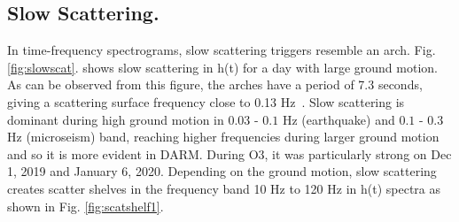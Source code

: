 \documentclass[12pt]{iopart}
\begin{document}
\subsection{Slow Scattering.}
In time-frequency spectrograms, slow scattering triggers resemble an arch.  Fig. \ref{fig:slowscat}. shows slow scattering in h(t) for a day with large ground motion.  As can be observed from this figure, the arches have a period of 7.3 seconds, giving a scattering surface frequency close to 0.13 Hz~\cite{alogsid}. 
Slow scattering is  dominant during high ground motion in $0.03$ - $0.1$ Hz (earthquake) and $0.1$ - $0.3$  Hz (microseism) band, reaching higher frequencies during larger ground motion and so it is more evident in DARM. During O3, it was particularly strong on Dec 1, 2019 and January 6, 2020.  Depending on the ground motion, slow scattering creates scatter shelves in the frequency band 10 Hz to 120 Hz in h(t) spectra as shown in Fig. \ref{fig:scatshelf1}.


\end{document}
